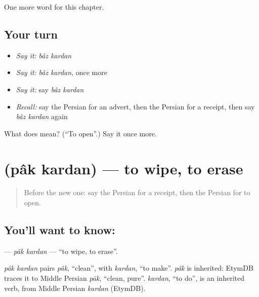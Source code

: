 \begin{grammarlens}[title={What you've built}]
One more word for this chapter.
\end{grammarlens}

\subsection*{Your turn}
\begin{itemize}
\raggedright
  \item \emph{Say it:} \emph{bâz kardan}
  \item \emph{Say it:} \emph{bâz kardan}, once more
  \item \emph{Say it:} say \emph{bâz kardan}
  \item \emph{Recall:} say the Persian for an advert, then the Persian for a receipt, then say \emph{bâz kardan} again
\end{itemize}

\begin{tcolorbox}[breakable,colback=teal!4,colframe=teal!35!black,title={Before you move on}]
What does   mean? (\textquotedblleft{}To open\textquotedblright{}.) Say it once more.
\end{tcolorbox}
\section[\texorpdfstring{\fa{پاک} \fa{کردن} (pâk kardan)}{پاک کردن (pâk kardan)}]{  (pâk kardan) — to wipe, to erase}

\label{lesson:FA-C140-pak-kardan}



\begin{quote}
Before the new one: say the Persian for a receipt, then the Persian for to open.
\end{quote}

\subsection*{You'll want to know:  }
\textbf{ } — \emph{pâk kardan} — \textquotedblleft{}to wipe, to erase\textquotedblright{}.

\begin{cousinweb}
\emph{pâk kardan} pairs \emph{pâk}, \textquotedblleft{}clean\textquotedblright{}, with \emph{kardan}, \textquotedblleft{}to make\textquotedblright{}. \emph{pâk} is inherited: EtymDB traces it to Middle Persian \emph{pāk}, \textquotedblleft{}clean, pure\textquotedblright{}. \emph{kardan}, \textquotedblleft{}to do\textquotedblright{}, is an inherited verb, from Middle Persian \emph{kardan} (EtymDB).
\end{cousinweb}

